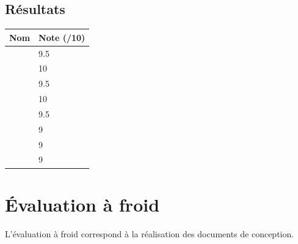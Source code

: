 \documentclass[asi, sansVersion]{picInsa}
\begin{document}
		\subsection*{Résultats}
			\begin{longtable}{|p{0.5\textwidth}|p{}|}
				\hline
					\rowcolor[gray]{0.90} Nom & Note (/10) \\
				\hline
					\Sergi & 9.5 \\
				\hline
					\Pierre & 10 \\
				\hline
					\Mathieu & 9.5 \\
				\hline
					\Michel & 10 \\
				\hline
					\Matthieu & 9.5 \\
				\hline
					\Kafui & 9 \\
				\hline
					\Melissa & 9 \\
				\hline
					\Florian & 9 \\
				\hline
			
			\end{longtable}
			
	\newpage
	\section*{Évaluation à froid}
		L'évaluation à froid correspond à la réalisation des documents de conception.
\end{document}
